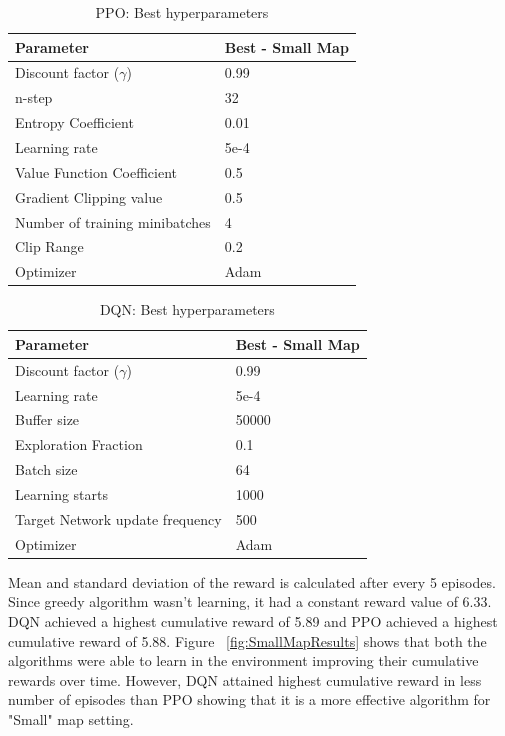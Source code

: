 \documentclass[12pt]{report}
\begin{document}
\begin{table} [!h]
\begin{center}
 \begin{tabular}{l | l} 
 \hline
 Parameter & Best - Small Map  \\ [0.5ex] 
 \hline\hline
 Discount factor ($\gamma$) & 0.99  \\
 n-step & 32\\
 Entropy Coefficient & 0.01\\
 Learning rate & 5e-4\\
 Value Function Coefficient & 0.5\\
 Gradient Clipping value &  0.5\\
 Number of training minibatches & 4\\
 Clip Range & 0.2\\
 Optimizer & Adam  \\ 
 \hline
\end{tabular}
\caption{PPO: Best hyperparameters}
\label{table:BestDQNHyperparameter}
\end{center}
\end{table}

\begin{table} [!h]
\begin{center}
 \begin{tabular}{l | l} 
 \hline
 Parameter & Best - Small Map  \\ [0.5ex] 
 \hline\hline
 Discount factor ($\gamma$) & 0.99 \\ 
 Learning rate & 5e-4\\
 Buffer size & 50000 \\
 Exploration Fraction & 0.1\\
 Batch size  & 64\\
 Learning starts & 1000\\
 Target Network update frequency & 500\\
 Optimizer & Adam \\ 
 \hline
\end{tabular}
\caption{DQN: Best hyperparameters}
\label{table:BestPPOHyperparameter}
\end{center}
\end{table}

Mean and standard deviation of the reward is calculated after every 5 episodes. Since greedy algorithm wasn't learning, it had a constant reward value of 6.33. DQN achieved a highest cumulative reward of 5.89 and PPO achieved a highest cumulative reward of 5.88. Figure ~\ref{fig:SmallMapResults} shows that both the algorithms were able to learn in the environment improving their cumulative rewards over time. However, DQN attained highest cumulative reward in less number of episodes than PPO showing that it is a more effective algorithm for "Small" map setting.  
\end{document}
